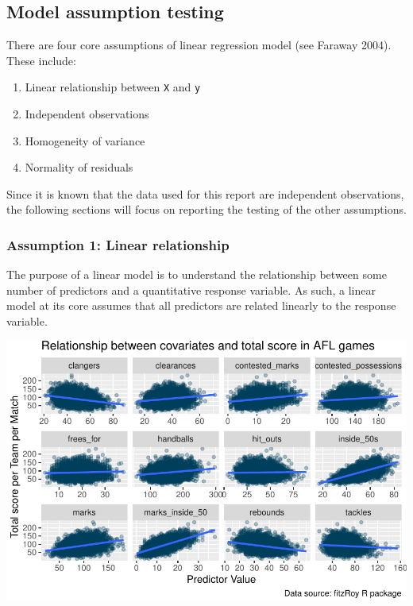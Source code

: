 \documentclass{article}
\begin{document}
\hypertarget{model-assumption-testing}{%
\subsection{Model assumption testing}\label{model-assumption-testing}}

There are four core assumptions of linear regression model (see Faraway
2004). These include:

\begin{enumerate}
\def\labelenumi{\arabic{enumi}.}
\tightlist
\item
  Linear relationship between \texttt{X} and \texttt{y}
\item
  Independent observations
\item
  Homogeneity of variance
\item
  Normality of residuals
\end{enumerate}

Since it is known that the data used for this report are independent
observations, the following sections will focus on reporting the testing
of the other assumptions.

\hypertarget{assumption-1-linear-relationship}{%
\subsubsection{Assumption 1: Linear
relationship}\label{assumption-1-linear-relationship}}

The purpose of a linear model is to understand the relationship between
some number of predictors and a quantitative response variable. As such,
a linear model at its core assumes that all predictors are related
linearly to the response variable.

\includegraphics{OLET5608_TrentHenderson_files/figure-latex/unnamed-chunk-4-1.pdf}
\end{document}

